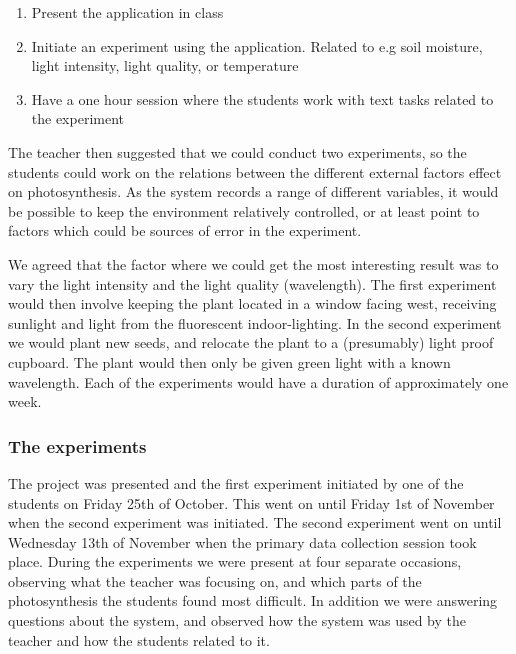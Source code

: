 \begin{enumerate}
\item{Present the application in class}
\item{Initiate an experiment using the application. Related to e.g soil moisture, light intensity, light quality, or temperature}
\item{Have a one hour session where the students work with text tasks related to the experiment}
\end{enumerate}

The teacher then suggested that we could conduct two experiments, so the students could work on the relations between the different external factors effect on photosynthesis. As the system records a range of different variables, it would be possible to keep the environment relatively controlled, or at least point to factors which could be sources of error in the experiment. 

We agreed that the factor where we could get the most interesting result was to vary the light intensity and the light quality (wavelength). The first experiment would then involve keeping the plant located in a window facing west, receiving sunlight and light from the fluorescent indoor-lighting. In the second experiment we would plant new seeds, and relocate the plant to a (presumably) light proof cupboard. The plant would then only be given green light with a known wavelength. Each of the experiments would have a duration of approximately one week. 

\subsubsection{The experiments}
The project was presented and the first experiment initiated by one of the students on Friday 25th of October. This went on until Friday 1st of November when the second experiment was initiated. The second experiment went on until Wednesday 13th of November when the primary data collection session took place. During the experiments we were present at four separate occasions, observing what the teacher was focusing on, and which parts of the photosynthesis the students found most difficult. In addition we were answering questions about the system, and observed how the system was used by the teacher and how the students related to it. 

